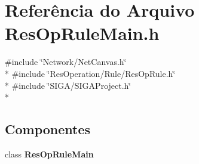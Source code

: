 \section{Referência do Arquivo Res\+Op\+Rule\+Main.\+h}
\label{_rule_2_res_op_rule_main_8h}
{\ttfamily \#include \char`\"{}Network/\+Net\+Canvas.\+h\char`\"{}}\\*
{\ttfamily \#include \char`\"{}Res\+Operation/\+Rule/\+Res\+Op\+Rule.\+h\char`\"{}}\\*
{\ttfamily \#include \char`\"{}S\+I\+G\+A/\+S\+I\+G\+A\+Project.\+h\char`\"{}}\\*
\subsection*{Componentes}
\begin{DoxyCompactItemize}
\item 
class {\bf Res\+Op\+Rule\+Main}
\end{DoxyCompactItemize}
